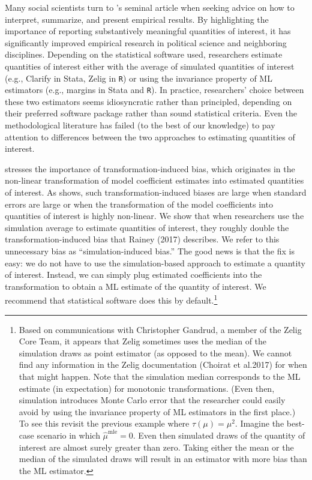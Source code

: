 \documentclass[11pt]{article}
\begin{document}
Many social scientists turn to \cite{KingTomzWittenberg2000}'s seminal article when seeking advice on how to interpret, summarize, and present empirical results. By highlighting the importance of reporting substantively meaningful quantities of interest, it has significantly improved empirical research in political science and neighboring disciplines. Depending on the statistical software used, researchers estimate quantities of interest either with the average of simulated quantities of interest (e.g., Clarify in Stata, Zelig in \texttt{R}) or using the invariance property of ML estimators (e.g., margins in Stata and \texttt{R}). In practice, researchers' choice between these two estimators seems idiosyncratic rather than principled, depending on their preferred software package rather than sound statistical criteria. Even the methodological literature has failed (to the best of our knowledge) to pay attention to differences between the two approaches to estimating quantities of interest.


\cite{Rainey2017} stresses the importance of transformation-induced bias, which originates in the non-linear transformation of model coefficient estimates into estimated quantities of interest.
As \cite{Rainey2017} shows, such transformation-induced biases are large when standard errors are large or when the transformation of the model coefficients into quantities of interest is highly non-linear. We show that when researchers use the simulation average to estimate quantities of interest, they roughly double the transformation-induced bias that Rainey (2017) describes. We refer to this unnecessary bias as ``simulation-induced bias.'' The good news is that the fix is easy: we do not have to use the simulation-based approach to estimate a quantity of interest. Instead, we can simply plug estimated coefficients into the transformation to obtain a ML estimate of the quantity of interest. We recommend that statistical software does this by default.\footnote{Based on communications with Christopher Gandrud, a member of the Zelig Core Team, it appears that Zelig sometimes uses the median of the simulation draws as point estimator (as opposed to the mean). We cannot find any information in the Zelig documentation (Choirat et al.\@ 2017) for when that might happen. Note that the simulation median corresponds to the ML estimate (in expectation) for monotonic transformations. (Even then, simulation introduces Monte Carlo error that the researcher could easily avoid by using the invariance property of ML estimators in the first place.) To see this revisit the previous example where $\tau(\mu) = \mu^2.$ Imagine the best-case scenario in which $\hat{\mu}^\text{mle} = 0$. Even then simulated draws of the quantity of interest are almost surely greater than zero. Taking either the mean or the median of the simulated draws will result in an estimator with more bias than the ML estimator.}
\end{document}
